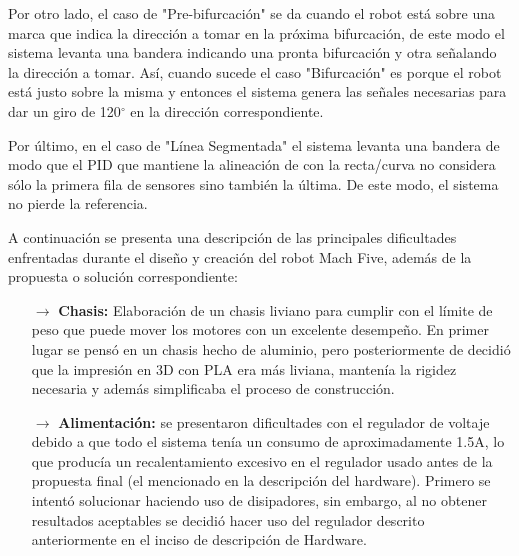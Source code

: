 \documentclass[10pt,twocolumn,legalpaper,draft]{article}
\begin{document}
Por otro lado, el caso de "Pre-bifurcación" se da cuando el robot está sobre una marca que indica la dirección a tomar en la próxima bifurcación, de este modo el sistema levanta una bandera indicando una pronta bifurcación y otra señalando la dirección a tomar. Así, cuando sucede el caso "Bifurcación" es porque el robot está justo sobre la misma y entonces el sistema genera las señales necesarias para dar un giro de 120$^{\circ}$ en la dirección correspondiente.\newline

Por último, en el caso de "Línea Segmentada" el sistema levanta una bandera de modo que el PID que mantiene la alineación de con la recta/curva no considera sólo la primera fila de sensores sino también la última. De este modo, el sistema no pierde la referencia.\newline
\vspace{0,8em}


\centerline{\Large{\textbf{}}}
\vspace{0,8em}
A continuación se presenta una descripción de las principales dificultades enfrentadas durante el diseño y creación del robot Mach Five, además de la propuesta o solución correspondiente:

\begin{itemize}
	\item[$\rightarrow$]\textbf{Chasis:} Elaboración de un chasis liviano para cumplir con el límite de peso que puede mover los motores con un excelente desempeño.\newline
En primer lugar se pensó en un chasis hecho de aluminio, pero posteriormente de decidió que la impresión en 3D con PLA era más liviana, mantenía la rigidez necesaria y además simplificaba el proceso de construcción.
	\item[$\rightarrow$]\textbf{Alimentación:} se presentaron dificultades con el regulador de voltaje debido a que todo el sistema tenía un consumo de aproximadamente 1.5A, lo que producía un recalentamiento excesivo en el regulador usado antes de la propuesta final (el mencionado en la descripción del hardware). Primero se intentó solucionar haciendo uso de disipadores, sin embargo, al no obtener resultados aceptables se decidió hacer uso del regulador descrito anteriormente en el inciso de descripción de Hardware.\newline
\end{itemize}
\end{document}
